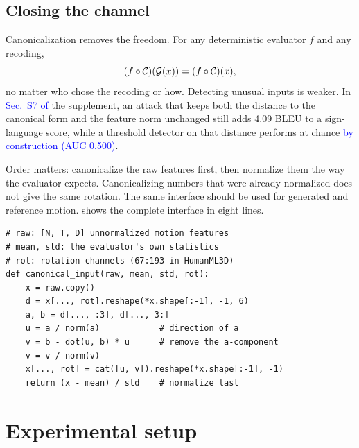 \documentclass[10pt,twocolumn,letterpaper]{article}
\newcommand{\new}[1]{\textcolor{blue}{#1}}%
\begin{document}
\subsection{Closing the channel}
Canonicalization removes the freedom. For any deterministic evaluator $f$ and any recoding,
\begin{equation}
(f\circ\mathcal{C})(\mathcal{G}(x))=(f\circ\mathcal{C})(x),\label{eq:closure}
\end{equation}
no matter who chose the recoding or how. Detecting unusual inputs is weaker. In \new{Sec.~S7 of} the supplement, an attack that keeps both the distance to the canonical form and the feature norm unchanged still adds 4.09 BLEU to a sign-language score, while a threshold detector on that distance performs at chance \new{by construction (AUC 0.500)}.

Order matters: canonicalize the raw features first, then normalize them the way the evaluator expects. Canonicalizing numbers that were already normalized does not give the same rotation. The same interface should be used for generated and reference motion.  shows the complete interface in eight lines.

\begin{algorithm}[t]
\caption{\textbf{Canonical evaluator input}, NumPy-like pseudocode. \texttt{norm}, \texttt{dot} and \texttt{cat} act on the last axis. Apply it to generated and reference motion and mask padded frames as usual; the released implementation adds input validation\new{, e.g.\ for $b$ parallel to $a$}.}\label{alg:canonical}
\begin{lstlisting}
# raw: [N, T, D] unnormalized motion features
# mean, std: the evaluator's own statistics
# rot: rotation channels (67:193 in HumanML3D)
def canonical_input(raw, mean, std, rot):
    x = raw.copy()
    d = x[..., rot].reshape(*x.shape[:-1], -1, 6)
    a, b = d[..., :3], d[..., 3:]
    u = a / norm(a)            # direction of a
    v = b - dot(u, b) * u      # remove the a-component
    v = v / norm(v)
    x[..., rot] = cat([u, v]).reshape(*x.shape[:-1], -1)
    return (x - mean) / std    # normalize last
\end{lstlisting}
\end{algorithm}

\section{Experimental setup}
\end{document}
